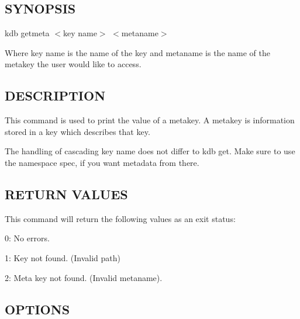 \subsection*{S\+Y\+N\+O\+P\+S\+IS}

{\ttfamily kdb getmeta $<$key name$>$ $<$metaname$>$}~\newline


Where {\ttfamily key name} is the name of the key and {\ttfamily metaname} is the name of the metakey the user would like to access.

\subsection*{D\+E\+S\+C\+R\+I\+P\+T\+I\+ON}

This command is used to print the value of a metakey. A metakey is information stored in a key which describes that key.

The handling of cascading {\ttfamily key name} does not differ to {\ttfamily kdb get}. Make sure to use the namespace {\ttfamily spec}, if you want metadata from there.

\subsection*{R\+E\+T\+U\+RN V\+A\+L\+U\+ES}

This command will return the following values as an exit status\+:~\newline



\begin{DoxyItemize}
\item 0\+: No errors.
\item 1\+: Key not found. (Invalid {\ttfamily path})
\item 2\+: Meta key not found. (Invalid {\ttfamily metaname}).
\end{DoxyItemize}

\subsection*{O\+P\+T\+I\+O\+NS}


